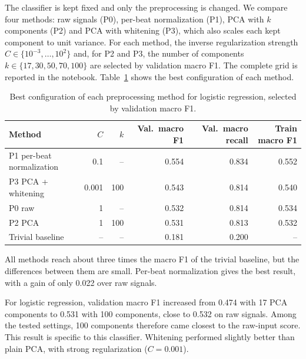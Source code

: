 \documentclass[11pt,oneside,a4paper]{article}
\begin{document}
    The classifier is kept fixed and only the preprocessing is
    changed. We compare four methods: raw signals (P0), per-beat
    normalization (P1), PCA with $k$ components (P2) and PCA with
    whitening (P3), which also scales each kept component to unit
    variance. For each method, the inverse regularization strength
    $C \in \{10^{-3}, \dots, 10^{2}\}$ and, for P2 and P3, the number
    of components $k \in \{17, 30, 50, 70, 100\}$ are selected by
    validation macro F1. The complete grid is reported in the
    notebook. Table~\ref{tab:logreg_results} shows the best
    configuration of each method.

    \begin{table}[htbp]
        \centering
        \begin{tabular}{lrrrrr}
            \toprule
            Method & $C$ & $k$ & Val.\ macro F1 & Val.\ macro recall
                & Train macro F1 \\
            \midrule
            P1 per-beat normalization & 0.1   & --  & 0.554 & 0.834 & 0.552 \\
            P3 PCA + whitening        & 0.001 & 100 & 0.543 & 0.814 & 0.540 \\
            P0 raw                    & 1     & --  & 0.532 & 0.814 & 0.534 \\
            P2 PCA                    & 1     & 100 & 0.531 & 0.813 & 0.532 \\
            \midrule
            Trivial baseline          & --    & --  & 0.181 & 0.200 & -- \\
            \bottomrule
        \end{tabular}
        \caption{Best configuration of each preprocessing method for
        logistic regression, selected by validation macro F1.}
        \label{tab:logreg_results}
    \end{table}

    All methods reach about three times the macro F1 of the trivial
    baseline, but the differences between them are small. Per-beat
    normalization gives the best result, with a gain of only 0.022
    over raw signals.

    For logistic regression, validation macro F1 increased from
    0.474 with 17 PCA components to 0.531 with 100 components,
    close to 0.532 on raw signals. Among the tested settings,
    100 components therefore came closest to the raw-input score.
    This result is specific to this classifier.
    Whitening performed slightly better than plain PCA, with
    strong regularization ($C=0.001$).
\end{document}
